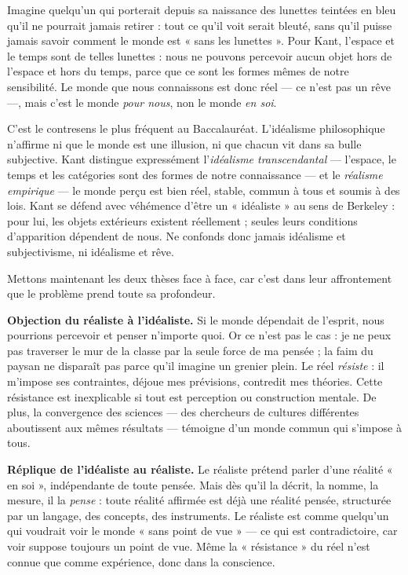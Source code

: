 \documentclass[11pt]{article}
\newcounter{popsec}
\newcounter{popsub}
\newcommand{\courssub}[1]{%
  \stepcounter{popsub}%
  \par\vspace{9pt}\noindent{\popxbold\fontsize{11.5}{13}\selectfont\color{popink}{\color{poporange}\thepopsec.\thepopsub}\hspace{6pt}#1}\par\nopagebreak\vspace{4pt}
}
\begin{document}
\begin{exemplebox}
Imagine quelqu'un qui porterait depuis sa naissance des lunettes teintées en bleu qu'il ne pourrait jamais retirer : tout ce qu'il voit serait bleuté, sans qu'il puisse jamais savoir comment le monde est « sans les lunettes ». Pour Kant, l'espace et le temps sont de telles lunettes : nous ne pouvons percevoir aucun objet hors de l'espace et hors du temps, parce que ce sont les formes mêmes de notre sensibilité. Le monde que nous connaissons est donc réel — ce n'est pas un rêve —, mais c'est le monde \emph{pour nous}, non le monde \emph{en soi}.
\end{exemplebox}

\begin{attention}
C'est le contresens le plus fréquent au Baccalauréat. L'idéalisme philosophique n'affirme ni que le monde est une illusion, ni que chacun vit dans sa bulle subjective. Kant distingue expressément l'\emph{idéalisme transcendantal} — l'espace, le temps et les catégories sont des formes de notre connaissance — et le \emph{réalisme empirique} — le monde perçu est bien réel, stable, commun à tous et soumis à des lois. Kant se défend avec véhémence d'être un « idéaliste » au sens de Berkeley : pour lui, les objets extérieurs existent réellement ; seules leurs conditions d'apparition dépendent de nous. Ne confonds donc jamais idéalisme et subjectivisme, ni idéalisme et rêve.
\end{attention}

\courssub{La confrontation : un débat sans vainqueur ?}

Mettons maintenant les deux thèses face à face, car c'est dans leur affrontement que le problème prend toute sa profondeur.

\textbf{Objection du réaliste à l'idéaliste.} Si le monde dépendait de l'esprit, nous pourrions percevoir et penser n'importe quoi. Or ce n'est pas le cas : je ne peux pas traverser le mur de la classe par la seule force de ma pensée ; la faim du paysan ne disparaît pas parce qu'il imagine un grenier plein. Le réel \emph{résiste} : il m'impose ses contraintes, déjoue mes prévisions, contredit mes théories. Cette résistance est inexplicable si tout est perception ou construction mentale. De plus, la convergence des sciences — des chercheurs de cultures différentes aboutissent aux mêmes résultats — témoigne d'un monde commun qui s'impose à tous.

\textbf{Réplique de l'idéaliste au réaliste.} Le réaliste prétend parler d'une réalité « en soi », indépendante de toute pensée. Mais dès qu'il la décrit, la nomme, la mesure, il la \emph{pense} : toute réalité affirmée est déjà une réalité pensée, structurée par un langage, des concepts, des instruments. Le réaliste est comme quelqu'un qui voudrait voir le monde « sans point de vue » — ce qui est contradictoire, car voir suppose toujours un point de vue. Même la « résistance » du réel n'est connue que comme expérience, donc dans la conscience.
\end{document}
